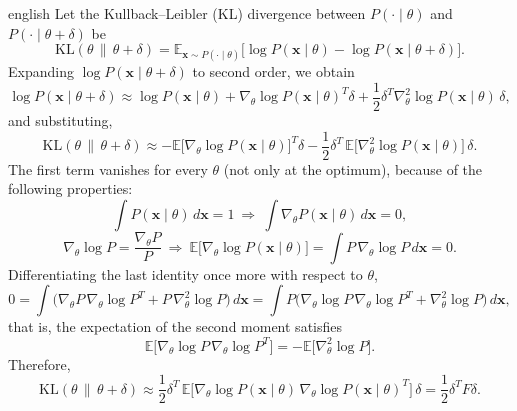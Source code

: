\begin{hyphenrules}{english}
Let the Kullback--Leibler (KL) divergence between $P(\cdot\mid\theta)$ and $P(\cdot\mid\theta+\delta)$ be
\cite{pascanu2013}
\[
  \mathrm{KL}(\theta\,\|\,\theta+\delta)=\mathbb{E}_{\mathbf{x}\sim P(\cdot\mid\theta)}\big[\log P(\mathbf{x}\mid\theta)-\log P(\mathbf{x}\mid\theta+\delta)\big].
\]
Expanding $\log P(\mathbf{x}\mid\theta+\delta)$ to second order, we obtain
\[
  \log P(\mathbf{x}\mid\theta+\delta)\approx\log P(\mathbf{x}\mid\theta)+\nabla_\theta\log P(\mathbf{x}\mid\theta)^{T}\delta
  +\frac12\delta^{T}\nabla^2_\theta\log P(\mathbf{x}\mid\theta)\,\delta,
\]
and substituting,
\begin{equation}
  \mathrm{KL}(\theta\,\|\,\theta+\delta)\approx-\mathbb{E}\big[\nabla_\theta\log P(\mathbf{x}\mid\theta)\big]^{T}\delta
  -\frac12\delta^{T}\,\mathbb{E}\big[\nabla^2_\theta\log P(\mathbf{x}\mid\theta)\big]\,\delta.
  \label{eq:app-kl}
\end{equation}
The first term vanishes for every $\theta$ (not only at the optimum), because of the following properties:
\[
  \int P(\mathbf{x}\mid\theta)\,d\mathbf{x}=1\ \Rightarrow\ \int\nabla_\theta P(\mathbf{x}\mid\theta)\,d\mathbf{x}=0,
\]
\[
  \nabla_\theta\log P=\frac{\nabla_\theta P}{P}\ \Rightarrow\
  \mathbb{E}\big[\nabla_\theta\log P(\mathbf{x}\mid\theta)\big]=\int P\,\nabla_\theta\log P\,d\mathbf{x}=0.
\]
Differentiating the last identity once more with respect to $\theta$,
\[
  0=\int\Big(\nabla_\theta P\,\nabla_\theta\log P^{T}+P\,\nabla^2_\theta\log P\Big)\,d\mathbf{x}
   =\int P\Big(\nabla_\theta\log P\,\nabla_\theta\log P^{T}+\nabla^2_\theta\log P\Big)\,d\mathbf{x},
\]
that is, the expectation of the second moment satisfies
\[
  \mathbb{E}\big[\nabla_\theta\log P\,\nabla_\theta\log P^{T}\big]=-\mathbb{E}\big[\nabla^2_\theta\log P\big].
\]
Therefore,
\[
  \mathrm{KL}(\theta\,\|\,\theta+\delta)\approx\frac12\delta^{T}\,
  \mathbb{E}\big[\nabla_\theta\log P(\mathbf{x}\mid\theta)\,\nabla_\theta\log P(\mathbf{x}\mid\theta)^{T}\big]\,\delta
  =\frac12\delta^{T}F\delta.
\]

\end{hyphenrules}
